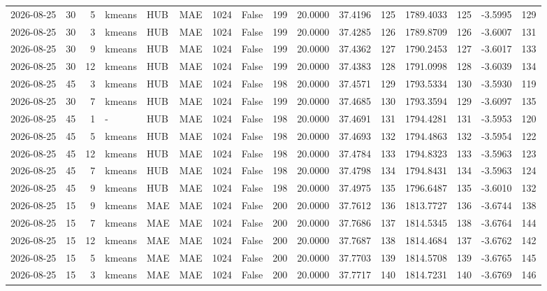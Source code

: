 \documentclass[10pt]{article}
\begin{document}
\begin{landscape}
\begin{longtable}{@{}lrrlllrcrrrrrrrr@{}}
2026-08-25 & 30 & 5 & kmeans & HUB & MAE & 1024 & False & 199 & 20.0000 & 37.4196 & 125 & 1789.4033 & 125 & -3.5995 & 129 \\
2026-08-25 & 30 & 3 & kmeans & HUB & MAE & 1024 & False & 199 & 20.0000 & 37.4285 & 126 & 1789.8709 & 126 & -3.6007 & 131 \\
2026-08-25 & 30 & 9 & kmeans & HUB & MAE & 1024 & False & 199 & 20.0000 & 37.4362 & 127 & 1790.2453 & 127 & -3.6017 & 133 \\
2026-08-25 & 30 & 12 & kmeans & HUB & MAE & 1024 & False & 199 & 20.0000 & 37.4383 & 128 & 1791.0998 & 128 & -3.6039 & 134 \\
2026-08-25 & 45 & 3 & kmeans & HUB & MAE & 1024 & False & 198 & 20.0000 & 37.4571 & 129 & 1793.5334 & 130 & -3.5930 & 119 \\
2026-08-25 & 30 & 7 & kmeans & HUB & MAE & 1024 & False & 199 & 20.0000 & 37.4685 & 130 & 1793.3594 & 129 & -3.6097 & 135 \\
2026-08-25 & 45 & 1 & - & HUB & MAE & 1024 & False & 198 & 20.0000 & 37.4691 & 131 & 1794.4281 & 131 & -3.5953 & 120 \\
2026-08-25 & 45 & 5 & kmeans & HUB & MAE & 1024 & False & 198 & 20.0000 & 37.4693 & 132 & 1794.4863 & 132 & -3.5954 & 122 \\
2026-08-25 & 45 & 12 & kmeans & HUB & MAE & 1024 & False & 198 & 20.0000 & 37.4784 & 133 & 1794.8323 & 133 & -3.5963 & 123 \\
2026-08-25 & 45 & 7 & kmeans & HUB & MAE & 1024 & False & 198 & 20.0000 & 37.4798 & 134 & 1794.8431 & 134 & -3.5963 & 124 \\
2026-08-25 & 45 & 9 & kmeans & HUB & MAE & 1024 & False & 198 & 20.0000 & 37.4975 & 135 & 1796.6487 & 135 & -3.6010 & 132 \\
2026-08-25 & 15 & 9 & kmeans & MAE & MAE & 1024 & False & 200 & 20.0000 & 37.7612 & 136 & 1813.7727 & 136 & -3.6744 & 138 \\
2026-08-25 & 15 & 7 & kmeans & MAE & MAE & 1024 & False & 200 & 20.0000 & 37.7686 & 137 & 1814.5345 & 138 & -3.6764 & 144 \\
2026-08-25 & 15 & 12 & kmeans & MAE & MAE & 1024 & False & 200 & 20.0000 & 37.7687 & 138 & 1814.4684 & 137 & -3.6762 & 142 \\
2026-08-25 & 15 & 5 & kmeans & MAE & MAE & 1024 & False & 200 & 20.0000 & 37.7703 & 139 & 1814.5708 & 139 & -3.6765 & 145 \\
2026-08-25 & 15 & 3 & kmeans & MAE & MAE & 1024 & False & 200 & 20.0000 & 37.7717 & 140 & 1814.7231 & 140 & -3.6769 & 146 \\

\end{longtable}
\end{landscape}
\end{document}
